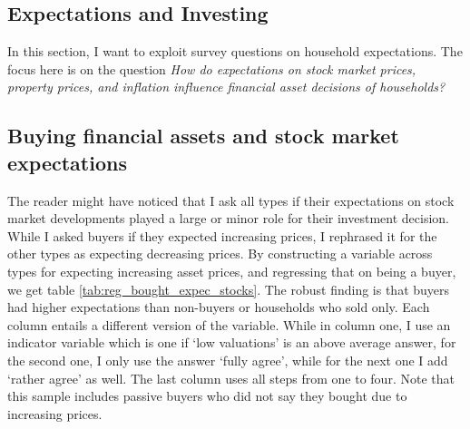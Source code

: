\documentclass[ProjectABM]{subfiles}
\begin{document}
\subsection{Expectations and Investing} \label{sec:results_exp}
In this section, I want to exploit survey questions on household expectations. The focus here is on the question \textit{How do expectations on stock market prices, property prices, and inflation influence financial asset decisions of households?} 

\subsection{Buying financial assets and stock market expectations}
The reader might have noticed that I ask all types if their expectations on stock market developments played a large or minor role for their investment decision. While I asked buyers if they expected increasing prices, I rephrased it for the other types as expecting decreasing prices. By constructing a variable across types for expecting increasing asset prices, and regressing that on being a buyer, we get table \ref{tab:reg_bought_expec_stocks}. The robust finding is that buyers had higher expectations than non-buyers or households who sold only. Each column entails a different version of the variable. While in column one, I use an indicator variable which is one if `low valuations' is an above average answer, for the second one, I only use the answer `fully agree', while for the next one I add `rather agree' as well. The last column uses all steps from one to four. Note that this sample includes passive buyers who did not say they bought due to increasing prices.





\end{document}
